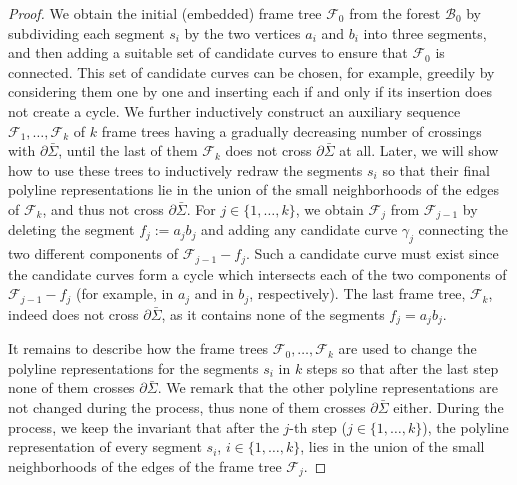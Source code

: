 \documentclass[a4paper,USenglish,cleveref,colorlinks=true,urlcolor=black,linkcolor=black,citecolor=black,thm-restate,authorcolumns]{lipics-v2021}
\theoremstyle{claimstyle}
\begin{document}
\begin{proof}
    We obtain the initial (embedded) frame tree ${\mathcal F}_0$ from the forest ${\mathcal B}_0$ by subdividing each segment $s_i$ by the two vertices $a_i$ and $b_i$ into three segments, and then adding a suitable set of candidate curves to ensure that $\mathcal{F}_0$ is connected.
    This set of candidate curves can be chosen, for example, greedily by considering them one by one and inserting each if and only if its insertion does not create a cycle.
    We further inductively construct an auxiliary sequence ${\mathcal F}_1,\dots,{\mathcal F}_k$ of $k$ frame trees having a gradually decreasing number of crossings with $\partial\bar\Sigma$, until the last of them ${\mathcal F}_k$ does not cross $\partial\bar\Sigma$ at all.
    Later, we will show how to use these trees to inductively redraw the segments $s_i$ so that their final polyline representations lie in the union of the small neighborhoods of the edges of ${\mathcal F}_k$, and thus not cross $\partial\bar\Sigma$.
    For $j\in\{1,\dots,k\}$, we obtain ${\mathcal F}_j$ from ${\mathcal F}_{j-1}$ by deleting the segment $f_j:=a_jb_j$ and adding any candidate curve $\gamma_j$ connecting the two different components of ${\mathcal F}_{j-1}-f_j$.
    Such a candidate curve must exist since the candidate curves form a cycle which intersects each of the two components of ${\mathcal F}_{j-1}-f_j$ (for example, in $a_j$ and in $b_j$, respectively).
    The last frame tree, ${\mathcal F}_k$, indeed does not cross $\partial\bar\Sigma$, as it contains none of the segments $f_j=a_jb_j$.

    It remains to describe how the frame trees  ${\mathcal F}_0,\dots,{\mathcal F}_k$ are used to change the polyline representations for the segments $s_i$ in $k$ steps so that after the last step none of them crosses $\partial\bar\Sigma$.
    We remark that the other polyline representations are not changed during the process, thus none of them crosses $\partial\bar\Sigma$ either.
    During the process, we keep the invariant that after the $j$-th step ($j\in \{1,\dots,k\}$), the polyline representation of every segment $s_i$, $i\in\{1,\ldots,k\}$, lies in the union of the small neighborhoods of the edges of the frame tree ${\mathcal F}_j$.


\end{proof}
\end{document}
